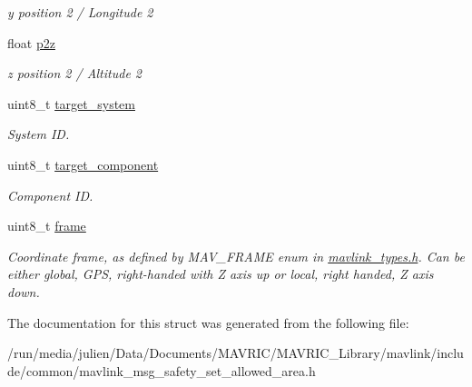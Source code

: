 \begin{DoxyCompactItemize}
\begin{DoxyCompactList}\small\item\em y position 2 / Longitude 2 \end{DoxyCompactList}\item 
\hypertarget{struct____mavlink__safety__set__allowed__area__t_a9609ca1370ee08e0acfb658d37bfa6d1}{float \hyperlink{struct____mavlink__safety__set__allowed__area__t_a9609ca1370ee08e0acfb658d37bfa6d1}{p2z}}\label{struct____mavlink__safety__set__allowed__area__t_a9609ca1370ee08e0acfb658d37bfa6d1}

\begin{DoxyCompactList}\small\item\em z position 2 / Altitude 2 \end{DoxyCompactList}\item 
\hypertarget{struct____mavlink__safety__set__allowed__area__t_acd133dd7eb95a5846b4354acdb74bef1}{uint8\+\_\+t \hyperlink{struct____mavlink__safety__set__allowed__area__t_acd133dd7eb95a5846b4354acdb74bef1}{target\+\_\+system}}\label{struct____mavlink__safety__set__allowed__area__t_acd133dd7eb95a5846b4354acdb74bef1}

\begin{DoxyCompactList}\small\item\em System I\+D. \end{DoxyCompactList}\item 
\hypertarget{struct____mavlink__safety__set__allowed__area__t_a4aea287fa77793e6c8c00b5b4f059aa9}{uint8\+\_\+t \hyperlink{struct____mavlink__safety__set__allowed__area__t_a4aea287fa77793e6c8c00b5b4f059aa9}{target\+\_\+component}}\label{struct____mavlink__safety__set__allowed__area__t_a4aea287fa77793e6c8c00b5b4f059aa9}

\begin{DoxyCompactList}\small\item\em Component I\+D. \end{DoxyCompactList}\item 
\hypertarget{struct____mavlink__safety__set__allowed__area__t_a52d592378bcb6ba92e9eb412bd12b46b}{uint8\+\_\+t \hyperlink{struct____mavlink__safety__set__allowed__area__t_a52d592378bcb6ba92e9eb412bd12b46b}{frame}}\label{struct____mavlink__safety__set__allowed__area__t_a52d592378bcb6ba92e9eb412bd12b46b}

\begin{DoxyCompactList}\small\item\em Coordinate frame, as defined by M\+A\+V\+\_\+\+F\+R\+A\+M\+E enum in \hyperlink{mavlink__types_8h_source}{mavlink\+\_\+types.\+h}. Can be either global, G\+P\+S, right-\/handed with Z axis up or local, right handed, Z axis down. \end{DoxyCompactList}\end{DoxyCompactItemize}


The documentation for this struct was generated from the following file\+:\begin{DoxyCompactItemize}
\item 
/run/media/julien/\+Data/\+Documents/\+M\+A\+V\+R\+I\+C/\+M\+A\+V\+R\+I\+C\+\_\+\+Library/mavlink/include/common/mavlink\+\_\+msg\+\_\+safety\+\_\+set\+\_\+allowed\+\_\+area.\+h\end{DoxyCompactItemize}

